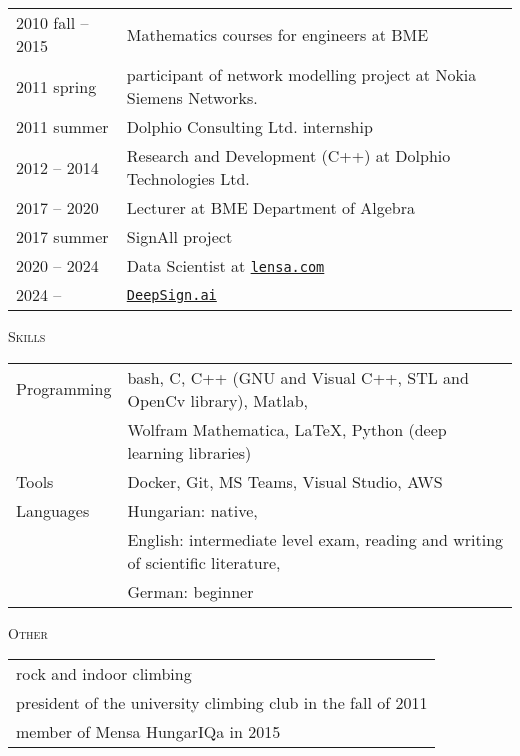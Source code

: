 \documentclass[12pt]{article}
\begin{document}
       \begin{tabular}{p{3cm}l}
	       2010 fall -- 2015 & Mathematics courses for engineers at BME\\
           2011 spring  & participant of network modelling project at Nokia Siemens Networks. \\
		   2011 summer    & Dolphio Consulting Ltd. internship\\
		   2012 -- 2014 & Research and Development (C++) at Dolphio Technologies Ltd. \\
           2017 -- 2020 & Lecturer at BME Department of Algebra \\
           2017 summer & SignAll project \\
           2020 -- 2024 & Data Scientist at \href{https://lensa.com/}{\texttt{lensa.com}} \\
	   2024 --      & \href{https://deepsign.ai/}{\texttt{DeepSign.ai}}
       \end{tabular}

 \textsc{Skills}

        \begin{tabular}{>{\raggedright\arraybackslash}p{3cm}l}
	       Programming &  bash, C, C++ (GNU and Visual C++, STL and OpenCv library), Matlab, \\
             & Wolfram Mathematica, \LaTeX, Python (deep learning libraries)\\
           Tools & Docker, Git, MS Teams, Visual Studio, AWS \\
           Languages & Hungarian: native, \\
                    & English: intermediate level exam, reading and writing of scientific literature, \\
                    & German: beginner
        \end{tabular}
 
 \textsc{Other}
 
 \begin{tabular}{l}
        rock and indoor climbing\\
        president of the university climbing club in the fall of 2011\\
        member of Mensa HungarIQa in 2015
    \end{tabular}
\end{document}
